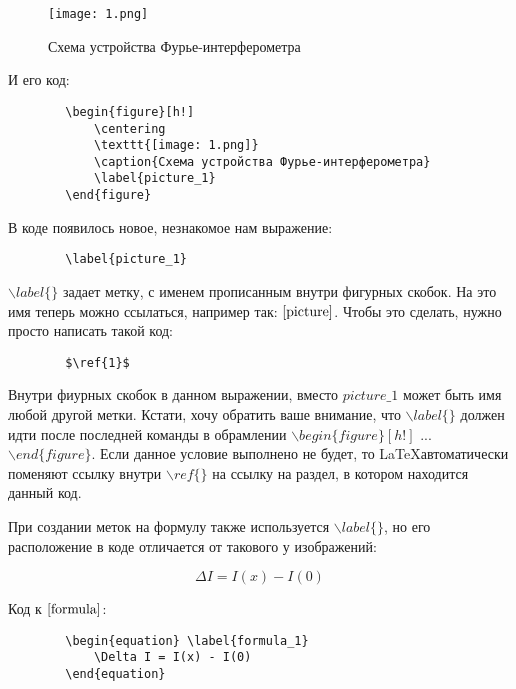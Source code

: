     \begin{figure}[h!]
        \centering
        \texttt{[image: 1.png]}
        \caption{Схема устройства Фурье-интерферометра}
        \label{picture}
    \end{figure}
    
    И его код:
    
    \begin{verbatim}
        \begin{figure}[h!]
            \centering
            \texttt{[image: 1.png]}
            \caption{Схема устройства Фурье-интерферометра}
            \label{picture_1}
        \end{figure}
    \end{verbatim}
    
    В коде появилось новое, незнакомое нам выражение: 

    \begin{verbatim}
        \label{picture_1}    
    \end{verbatim}

    $\backslash label\{\}$ задает метку, 
    с именем прописанным внутри фигурных скобок. На это имя теперь можно ссылаться, например так: $\ref{picture}$. Чтобы это сделать, нужно просто написать такой код:
    
    \begin{verbatim}
        $\ref{1}$
    \end{verbatim}
    
    Внутри фиурных скобок в данном выражении, вместо $picture\_1$ может быть имя любой другой метки. Кстати, хочу обратить ваше внимание, что $\backslash label\{\}$ должен идти после последней команды в обрамлении $\backslash begin\{figure\}[h!]$ ... $\backslash end\{figure\}$. Если данное условие выполнено не будет, то \LaTeX автоматически поменяют ссылку внутри $\backslash ref\{\}$ на ссылку на раздел, в котором находится данный код.
    
    При создании меток на формулу также используется $\backslash label\{\}$, но его расположение в коде отличается от такового у изображений:
    
    \begin{equation} \label{formula}
        \Delta I = I(x) - I(0)
    \end{equation}
    
    Код к $\eqref{formula}$:
    
    
    \begin{verbatim}
        \begin{equation} \label{formula_1}
            \Delta I = I(x) - I(0)
        \end{equation}
    \end{verbatim}
    
